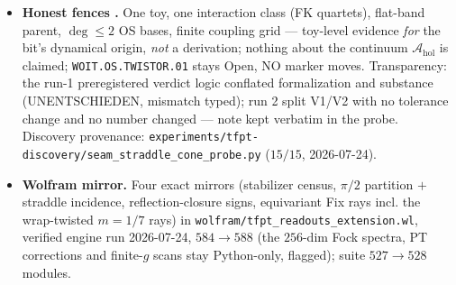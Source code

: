 \begin{itemize}[leftmargin=1.5em]
{member}: stabilizer $=$ the full clock$+$mirror group (rotations $\{0,4,8,12\}$, reflection axes
$\{3,7,11,15\}$ $=$ four admissible bond cuts, straddled $\{7,15\}$), the four quartets \emph{partition}
the $16$-circle, and every straddling quartet is reflection-\emph{closed} across its cut with exact sign
$+1$; $m=2/6$ straddle asymmetrically; odd $m$ carry no bond axis (the typed \vref{v521}/\vref{v525}
placement artifact). $\operatorname{Fix}(G_\delta)$ is $1$-dimensional throughout: uniform on $m=2..6$,
NS-wrap-\emph{twisted} $(1,-1,1,1)/(-1,-1,-1,1)$ on the tight members $m=1/7$. Typed cross-link: the
RP-selected member $m=4$ is exactly the carrier of the \vref{v528} twist-class order parameter $O=1/2$ ---
the dynamical selector and the kinematic definition point at the \emph{same} member.
\item \textbf{Honest fences \mC.} One toy, one interaction class (FK quartets), flat-band parent,
$\deg\le2$ OS bases, finite coupling grid --- toy-level evidence \emph{for} the bit's dynamical origin,
\emph{not} a derivation; nothing about the continuum $\mathcal A_{\mathrm{hol}}$ is claimed;
\texttt{WOIT.OS.TWISTOR.01} stays Open, NO marker moves. Transparency: the run-1 preregistered verdict
logic conflated formalization and substance (UNENTSCHIEDEN, mismatch typed); run 2 split V1/V2 with no
tolerance change and no number changed --- note kept verbatim in the probe. Discovery provenance:
\texttt{experiments/tfpt-discovery/seam\_straddle\_cone\_probe.py} ($15/15$, 2026-07-24).
\item \textbf{Wolfram mirror.} Four exact mirrors (stabilizer census, $\pi/2$ partition $+$ straddle
incidence, reflection-closure signs, equivariant Fix rays incl. the wrap-twisted $m=1/7$ rays) in
\texttt{wolfram/tfpt\_readouts\_extension.wl}, verified engine run 2026-07-24, $584\to588$ (the $256$-dim
Fock spectra, PT corrections and finite-$g$ scans stay Python-only, flagged); suite $527\to528$ modules.
\end{itemize}

